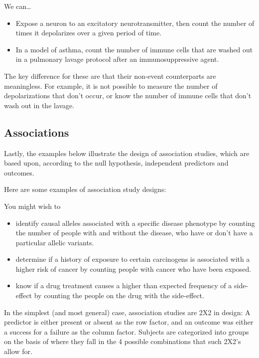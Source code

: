 \documentclass[]{book}
\begin{document}
We can\ldots{}

\begin{itemize}
\item
  Expose a neuron to an excitatory neurotransmitter, then count the number of times it depolarizes over a given period of time.
\item
  In a model of asthma, count the number of immune cells that are washed out in a pulmonary lavage protocol after an immunosuppressive agent.
\end{itemize}

The key difference for these are that their non-event counterparts are meaningless. For example, it is not possible to measure the number of depolarizations that don't occur, or know the number of immune cells that don't wash out in the lavage.

\hypertarget{associations}{%
\subsection{Associations}\label{associations}}

Lastly, the examples below illustrate the design of association studies, which are based upon, according to the null hypothesis, independent predictors and outcomes.

Here are some examples of association study designs:

You might wish to

\begin{itemize}
\item
  identify causal alleles associated with a specific disease phenotype by counting the number of people with and without the disease, who have or don't have a particular allelic variants.
\item
  determine if a history of exposure to certain carcinogens is associated with a higher risk of cancer by counting people with cancer who have been exposed.
\item
  know if a drug treatment causes a higher than expected frequency of a side-effect by counting the people on the drug with the side-effect.
\end{itemize}

In the simplest (and most general) case, association studies are 2X2 in design: A predictor is either present or absent as the row factor, and an outcome was either a success for a failure as the column factor. Subjects are categorized into groups on the basis of where they fall in the 4 possible combinations that such 2X2's allow for.
\end{document}
